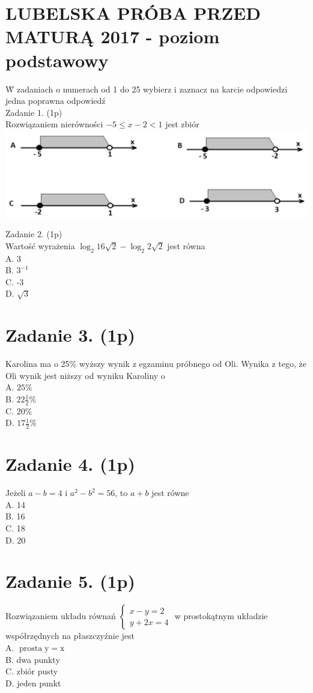 \documentclass[10pt]{article}
\begin{document}
\section*{LUBELSKA PRÓBA PRZED MATURĄ 2017 - poziom podstawowy}
W̄ zadaniach o numerach od 1 do 25 wybierz i zaznacz na karcie odpowiedzi jedna poprawna odpowiedź\\
Zadanie 1. (1p)\\
Rozwiązaniem nierówności \(-5 \leq x-2<1\) jest zbiór\\
\includegraphics[max width=\textwidth, center]{2024_11_21_2a465a6670163fcfd70dg-02}

Zadanie 2. (1p)\\
Wartość wyrażenia \(\log _{2} 16 \sqrt{2}-\log _{2} 2 \sqrt{2}\) jest równa\\
A. 3\\
B. \(3^{-1}\)\\
C. -3\\
D. \(\sqrt{3}\)

\section*{Zadanie 3. (1p)}
Karolina ma o 25\% wyższy wynik z egzaminu próbnego od Oli. Wynika z tego, że Oli wynik jest niższy od wyniku Karoliny o\\
A. \(25 \%\)\\
B. \(22 \frac{1}{2} \%\)\\
C. \(20 \%\)\\
D. \(17 \frac{1}{2} \%\)

\section*{Zadanie 4. (1p)}
Jeżeli \(a-b=4\) i \(a^{2}-b^{2}=56\), to \(a+b\) jest równe\\
A. 14\\
B. 16\\
C. 18\\
D. 20

\section*{Zadanie 5. (1p)}
Rozwiązaniem układu równań \(\left\{\begin{array}{l}x-y=2 \\ y+2 x=4\end{array}\right.\) w prostokątnym układzie współrzędnych na płaszczyźnie jest\\
A. \(\operatorname{prosta} \mathrm{y}=\mathrm{x}\)\\
B. dwa punkty\\
C. zbiór pusty\\
D. jeden punkt
\end{document}
